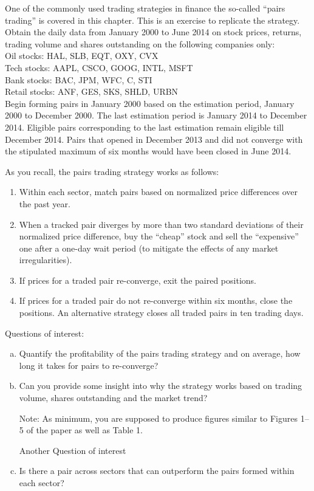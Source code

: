 \prob One of the commonly used trading strategies in finance the so-called ``pairs trading'' is covered in this chapter. This is an exercise to replicate the strategy. Obtain the daily data from January 2000 to June 2014 on stock prices, returns, trading volume and shares outstanding on the following companies only: \\

\indent Oil stocks: HAL, SLB, EQT, OXY, CVX \\

\indent Tech stocks: AAPL, CSCO, GOOG, INTL, MSFT \\

\indent Bank stocks: BAC, JPM, WFC, C, STI \\

\indent Retail stocks: ANF, GES, SKS, SHLD, URBN \\

Begin forming pairs in January 2000 based on the estimation period, January 2000 to December 2000. The last estimation period is January 2014 to December 2014. Eligible pairs corresponding to the last estimation remain eligible till December 2014. Pairs that opened in December 2013 and did not converge with the stipulated maximum of six months would have been closed in June 2014.


As you recall, the pairs trading strategy works as follows:
	\begin{enumerate}[1.]
	\item Within each sector, match pairs based on normalized price differences over the past year.
	\item When a tracked pair diverges by more than two standard deviations of their normalized price difference, buy the ``cheap'' stock and sell the ``expensive'' one after a one-day wait period (to mitigate the effects of any market irregularities).
	\item If prices for a traded pair re-converge, exit the paired positions.
	\item If prices for a traded pair do not re-converge within six months, close the positions. An alternative strategy closes all traded pairs in ten trading days.
	\end{enumerate}


\noindent Questions of interest:
	\begin{enumerate}[(a)]
	\item Quantify the profitability of the pairs trading strategy and on average, how long it takes for pairs to re-converge?
	\item Can you provide some insight into why the strategy works based on trading volume, shares outstanding and the market trend?

Note: As minimum, you are supposed to produce figures similar to Figures 1--5 of the paper as well as Table 1.

Another Question of interest
	\item Is there a pair across sectors that can outperform the pairs formed within each sector? \\
	\end{enumerate}






